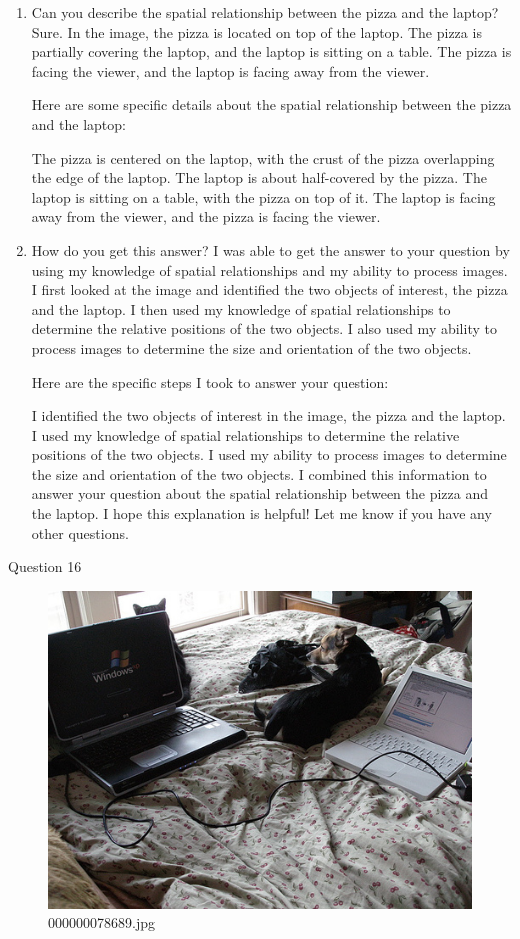     \begin{enumerate}
        \item Can you describe the spatial relationship between the pizza and the laptop?
        \subitem 
        Sure. In the image, the pizza is located on top of the laptop. The pizza is partially covering the laptop, and the laptop is sitting on a table. The pizza is facing the viewer, and the laptop is facing away from the viewer.
        
        Here are some specific details about the spatial relationship between the pizza and the laptop:
        
        The pizza is centered on the laptop, with the crust of the pizza overlapping the edge of the laptop.
        The laptop is about half-covered by the pizza.
        The laptop is sitting on a table, with the pizza on top of it.
        The laptop is facing away from the viewer, and the pizza is facing the viewer.
        
        \item How do you get this answer?
        \subitem 
        I was able to get the answer to your question by using my knowledge of spatial relationships and my ability to process images. I first looked at the image and identified the two objects of interest, the pizza and the laptop. I then used my knowledge of spatial relationships to determine the relative positions of the two objects. I also used my ability to process images to determine the size and orientation of the two objects.
        
        Here are the specific steps I took to answer your question:
        
        I identified the two objects of interest in the image, the pizza and the laptop.
        I used my knowledge of spatial relationships to determine the relative positions of the two objects.
        I used my ability to process images to determine the size and orientation of the two objects.
        I combined this information to answer your question about the spatial relationship between the pizza and the laptop.
        I hope this explanation is helpful! Let me know if you have any other questions.
    \end{enumerate}
Question 16
    \begin{figure}[h]
        \centering
        \includegraphics[width=0.8\linewidth]{../image set/easy/000000078689.jpg}
        \caption{000000078689.jpg}
    \end{figure}
